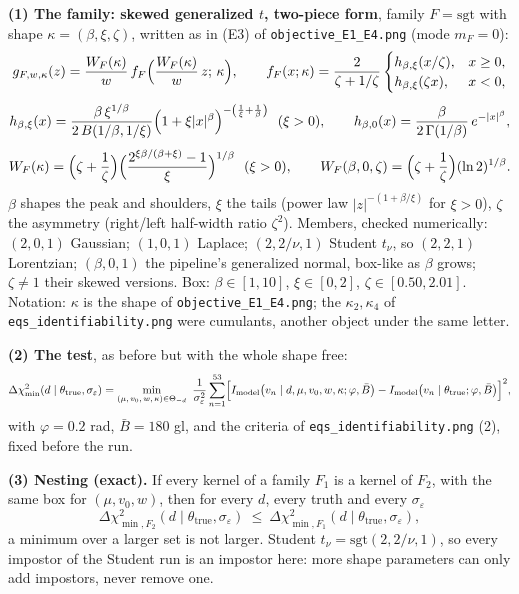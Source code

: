 \documentclass[11pt,varwidth=17.6cm,border=14pt]{standalone}
\newcommand{\Imod}{I_{\mathrm{model}}}
\begin{document}
\textbf{(1) The family: skewed generalized $t$, two-piece form}, family $F=\mathrm{sgt}$ with shape $\kappa=(\beta,\xi,\zeta)$, written as in (E3) of \texttt{objective\_E1\_E4.png} (mode $m_F=0$):
\begin{gather*}
g_{F,w,\kappa}(z)=\frac{W_F(\kappa)}{w}\,f_F\Bigl(\frac{W_F(\kappa)}{w}\,z;\,\kappa\Bigr),\qquad
f_F(x;\kappa)=\frac{2}{\zeta+1/\zeta}\begin{cases}h_{\beta,\xi}(x/\zeta), & x\ge0,\\ h_{\beta,\xi}(\zeta x), & x<0,\end{cases}\\[4pt]
h_{\beta,\xi}(x)=\frac{\beta\,\xi^{1/\beta}}{2\,B(1/\beta,1/\xi)}\Bigl(1+\xi\lvert x\rvert^{\beta}\Bigr)^{-\left(\frac1\xi+\frac1\beta\right)}\ \ (\xi>0),\qquad
h_{\beta,0}(x)=\frac{\beta}{2\,\Gamma(1/\beta)}\,e^{-\lvert x\rvert^{\beta}},\\[4pt]
W_F(\kappa)=\Bigl(\zeta+\frac1\zeta\Bigr)\Bigl(\frac{2^{\xi\beta/(\beta+\xi)}-1}{\xi}\Bigr)^{1/\beta}\ \ (\xi>0),\qquad
W_F(\beta,0,\zeta)=\Bigl(\zeta+\frac1\zeta\Bigr)(\ln2)^{1/\beta}.
\end{gather*}
$\beta$ shapes the peak and shoulders, $\xi$ the tails (power law $\lvert z\rvert^{-(1+\beta/\xi)}$ for $\xi>0$), $\zeta$ the asymmetry (right/left half-width ratio $\zeta^{2}$). Members, checked numerically: $(2,0,1)$ Gaussian; $(1,0,1)$ Laplace; $(2,2/\nu,1)$ Student $t_\nu$, so $(2,2,1)$ Lorentzian; $(\beta,0,1)$ the pipeline's generalized normal, box-like as $\beta$ grows; $\zeta\neq1$ their skewed versions. Box: $\beta\in[1,10]$, $\xi\in[0,2]$, $\zeta\in[0.50,2.01]$. Notation: $\kappa$ is the shape of \texttt{objective\_E1\_E4.png}; the $\kappa_2,\kappa_4$ of \texttt{eqs\_identifiability.png} were cumulants, another object under the same letter.

\medskip
\textbf{(2) The test}, as before but with the whole shape free:
\begin{equation*}
\Delta\chi^2_{\min}(d\mid\theta_{\mathrm{true}},\sigma_\varepsilon)=\min_{(\mu,\,v_0,\,w,\,\kappa)\in\Theta_{-d}}\ \frac{1}{\sigma_\varepsilon^{2}}\sum_{n=1}^{53}\Bigl[\Imod\bigl(v_n\mid d,\mu,v_0,w,\kappa;\varphi,\bar B\bigr)-\Imod\bigl(v_n\mid\theta_{\mathrm{true}};\varphi,\bar B\bigr)\Bigr]^{2},
\end{equation*}
with $\varphi=0.2$ rad, $\bar B=180$ gl, and the criteria of \texttt{eqs\_identifiability.png} (2), fixed before the run.

\medskip
\textbf{(3) Nesting (exact).} If every kernel of a family $F_1$ is a kernel of $F_2$, with the same box for $(\mu,v_0,w)$, then for every $d$, every truth and every $\sigma_\varepsilon$
\begin{equation*}
\Delta\chi^2_{\min,F_2}(d\mid\theta_{\mathrm{true}},\sigma_\varepsilon)\ \le\ \Delta\chi^2_{\min,F_1}(d\mid\theta_{\mathrm{true}},\sigma_\varepsilon),
\end{equation*}
a minimum over a larger set is not larger. Student $t_\nu=\mathrm{sgt}(2,2/\nu,1)$, so every impostor of the Student run is an impostor here: more shape parameters can only add impostors, never remove one.
\end{document}
